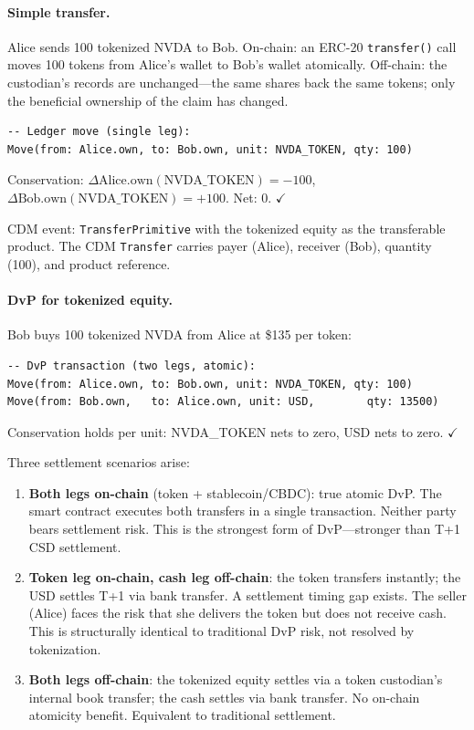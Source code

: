 \documentclass[11pt,a4paper]{article}
\begin{document}
\paragraph{Simple transfer.} Alice sends 100 tokenized NVDA to Bob. On-chain: an ERC-20 \texttt{transfer()} call moves 100 tokens from Alice's wallet to Bob's wallet atomically. Off-chain: the custodian's records are unchanged---the same shares back the same tokens; only the beneficial ownership of the claim has changed.

\begin{lstlisting}
-- Ledger move (single leg):
Move(from: Alice.own, to: Bob.own, unit: NVDA_TOKEN, qty: 100)
\end{lstlisting}

\noindent Conservation: $\Delta\text{Alice.own}(\text{NVDA\_TOKEN}) = -100$, $\Delta\text{Bob.own}(\text{NVDA\_TOKEN}) = +100$. Net: $0$. $\checkmark$

\noindent CDM event: \texttt{TransferPrimitive} with the tokenized equity as the transferable product. The CDM \texttt{Transfer} carries payer (Alice), receiver (Bob), quantity (100), and product reference.

\paragraph{DvP for tokenized equity.} Bob buys 100 tokenized NVDA from Alice at \$135 per token:

\begin{lstlisting}
-- DvP transaction (two legs, atomic):
Move(from: Alice.own, to: Bob.own, unit: NVDA_TOKEN, qty: 100)
Move(from: Bob.own,   to: Alice.own, unit: USD,        qty: 13500)
\end{lstlisting}

\noindent Conservation holds per unit: NVDA\_TOKEN nets to zero, USD nets to zero. $\checkmark$

Three settlement scenarios arise:

\begin{enumerate}[nosep]
\item \textbf{Both legs on-chain} (token + stablecoin/CBDC): true atomic DvP. The smart contract executes both transfers in a single transaction. Neither party bears settlement risk. This is the strongest form of DvP---stronger than T+1 CSD settlement.
\item \textbf{Token leg on-chain, cash leg off-chain}: the token transfers instantly; the USD settles T+1 via bank transfer. A settlement timing gap exists. The seller (Alice) faces the risk that she delivers the token but does not receive cash. This is structurally identical to traditional DvP risk, not resolved by tokenization.
\item \textbf{Both legs off-chain}: the tokenized equity settles via a token custodian's internal book transfer; the cash settles via bank transfer. No on-chain atomicity benefit. Equivalent to traditional settlement.
\end{enumerate}
\end{document}
